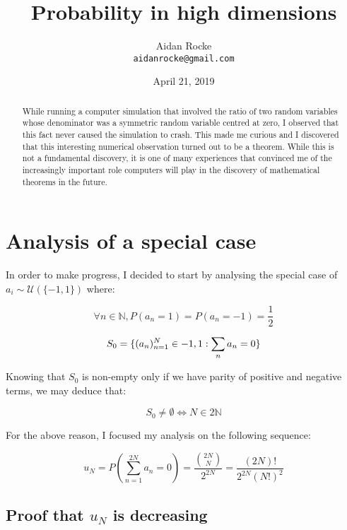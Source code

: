 \documentclass{article}
\title{Probability in high dimensions}
\date{April 21, 2019}
\author{%
  Aidan Rocke\\
  \texttt{aidanrocke@gmail.com} \\
}
\begin{document}
\maketitle

\begin{abstract}
   While running a computer simulation that involved the ratio of two random variables whose denominator was a symmetric random variable centred at zero, I observed that this fact never caused the simulation to crash. This made me curious and I discovered that this interesting numerical observation turned out to be a theorem. While this is not a fundamental discovery, it is one of many experiences that convinced me of the increasingly important role computers will play in the discovery of mathematical theorems in the future. 
   \end{abstract}

\section{Analysis of a special case}

In order to make progress, I decided to start by analysing the special case of $a_i \sim \mathcal{U}(\{-1,1\})$ where:

\begin{equation}
\forall n \in \mathbb{N}, P(a_n=1)=P(a_n=-1)=\frac{1}{2}
\end{equation}

\begin{equation}
S_0  = \{ (a_n)_{n=1}^N \in \\{-1,1\\} : \sum_n a_n = 0\}
\end{equation}

Knowing that $S_0$ is non-empty only if we have parity of positive and negative terms, we may deduce that:

\begin{equation}
S_0 \neq \emptyset \iff N \in 2\mathbb{N}
\end{equation}

For the above reason, I focused my analysis on the following sequence:

\begin{equation}
u_N = P(\sum_{n=1}^{2N} a_n = 0)= \frac{{2N \choose N}}{2^{2N}} = \frac{(2N)!}{2^{2N}(N!)^2}
\end{equation}

\subsection{Proof that $u_N$ is decreasing}
\end{document}
